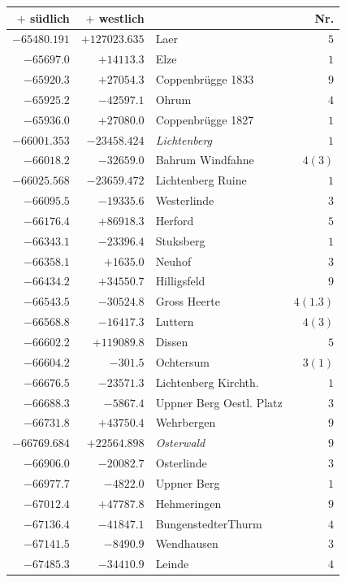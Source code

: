 \clearpage
\begin{center}\begingroup\fontsize{8}{9}\selectfont
\setlength{\tabcolsep}{4pt}
\begin{tabular}{r|r|p{170pt}|r}\hline
\(+\) südlich&\(+\) westlich&&Nr.\\\hline
\(-65480.191\)&\(+127023.635\)&Laer&\(5\)\\
\(-65697.0\)&\(+14113.3\)&Elze&\(1\)\\
\(-65920.3\)&\(+27054.3\)&Coppenbrügge 1833&\(9\)\\
\(-65925.2\)&\(-42597.1\)&Ohrum&\(4\)\\
\(-65936.0\)&\(+27080.0\)&Coppenbrügge 1827&\(1\)\\
\(-66001.353\)&\(-23458.424\)&\textit{Lichtenberg}&\(1\)\\
\(-66018.2\)&\(-32659.0\)&Bahrum Windfahne&\(4 (3)\)\\
\(-66025.568\)&\(-23659.472\)&Lichtenberg Ruine&\(1\)\\
\(-66095.5\)&\(-19335.6\)&Westerlinde&\(3\)\\
\(-66176.4\)&\(+86918.3\)&Herford&\(5\)\\
\(-66343.1\)&\(-23396.4\)&Stuksberg&\(1\)\\
\(-66358.1\)&\(+1635.0\)&Neuhof&\(3\)\\
\(-66434.2\)&\(+34550.7\)&Hilligsfeld&\(9\)\\
\(-66543.5\)&\(-30524.8\)&Gross Heerte&\(4(1.3)\)\\
\(-66568.8\)&\(-16417.3\)&Luttern&\(4 (3)\)\\
\(-66602.2\)&\(+119089.8\)&Dissen&\(5\)\\
\(-66604.2\)&\(-301.5\)&Ochtersum&\(3 (1)\)\\
\(-66676.5\)&\(-23571.3\)&Lichtenberg Kirchth.&\(1\)\\
\(-66688.3\)&\(-5867.4\)&Uppner Berg Oestl. Platz&\(3\)\\
\(-66731.8\)&\(+43750.4\)&Wehrbergen&\(9\)\\
\(-66769.684\)&\(+22564.898\)&\textit{Osterwald}&\(9\)\\
\(-66906.0\)&\(-20082.7\)&Osterlinde&\(3\)\\
\(-66977.7\)&\(-4822.0\)&Uppner Berg&\(1\)\\
\(-67012.4\)&\(+47787.8\)&Hehmeringen&\(9\)\\
\(-67136.4\)&\(-41847.1\)&BungenstedterThurm&\(4\)\\
\(-67141.5\)&\(-8490.9\)&Wendhausen&\(3\)\\
\(-67485.3\)&\(-34410.9\)&Leinde&\(4\)\\

\end{tabular}
\end{center}
